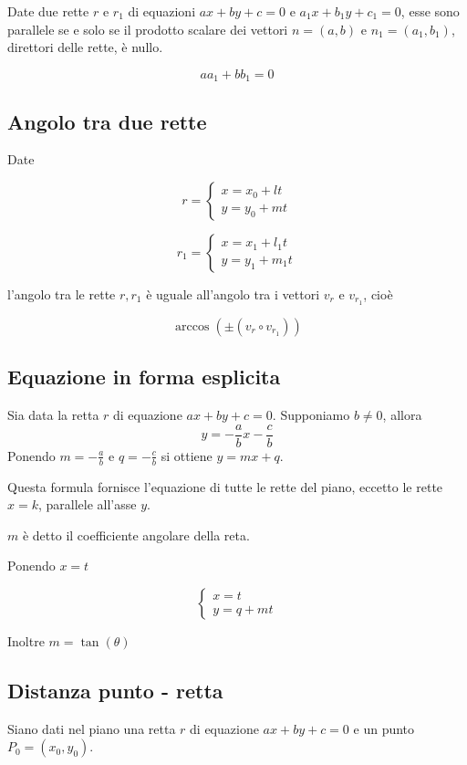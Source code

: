 Date due rette $r$ e $r_1$ di equazioni $ax+by+c=0$ e $a_1x+b_1y+c_1=0$, esse sono parallele se e solo se il prodotto scalare dei vettori $n  = (a,b)$ e $n_1 = (a_1,b_1)$, direttori delle rette, è nullo.

$$aa_1+bb_1 = 0$$

\subsection{Angolo tra due rette}

Date

$$
r = \begin{cases}
x = x_0 + lt \\
y = y_0 + mt
\end{cases}
$$

$$
r_1 = \begin{cases}
x = x_1 + l_1t \\
y = y_1 + m_1t
\end{cases}
$$

l'angolo tra le rette $r,r_1$ è uguale all'angolo tra i vettori $v_r$ e $v_{r_1}$, cioè

$$\arccos(\pm (v_r \circ v_{r_1}))$$

\subsection{Equazione in forma esplicita}

Sia data la retta $r$ di equazione $ax+by+c=0$. Supponiamo $b \neq 0$, allora
$$y = -\frac{a}{b} x - \frac{c}{b}$$
Ponendo $m= -\frac{a}{b}$ e $q = -\frac{c}{b}$ si ottiene $y=mx+q$.

Questa formula fornisce l'equazione di tutte le rette del piano, eccetto le rette $x=k$, parallele all'asse $y$.

$m$ è detto il coefficiente angolare della reta.

Ponendo $x=t$

$$
\begin{cases}
x= t \\
y=q+mt
\end{cases}
$$

Inoltre
$m = \tan(\theta)$


\subsection{Distanza punto - retta}

Siano dati nel piano una retta $r$ di equazione $ax+by+c=0$ e un punto $P_0 = (x_0,y_0)$.

